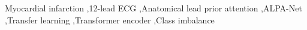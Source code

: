 \documentclass[a4paper,fleqn]{cas-dc}
\begin{document}
\begin{keywords}
Myocardial infarction \sep 12-lead ECG \sep Anatomical lead prior attention \sep ALPA-Net \sep Transfer learning \sep Transformer encoder \sep Class imbalance
\end{keywords}

\maketitle






\end{document}
